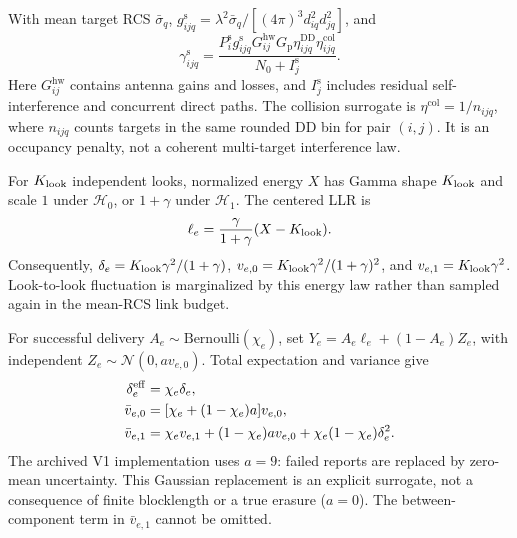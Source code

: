 With mean target RCS $\bar\sigma_q$,
$g_{ijq}^{\mathrm s}=\lambda^2\bar\sigma_q/[(4\pi)^3d_{iq}^2d_{jq}^2]$,
and
\begin{equation}
 \gamma_{ijq}^{\mathrm s}=
 \frac{P_i^{\mathrm s}g_{ijq}^{\mathrm s}G_{ij}^{\mathrm{hw}}G_{\mathrm p}
 \eta_{ijq}^{\mathrm{DD}}\eta_{ijq}^{\mathrm{col}}}
 {N_0+I_j^{\mathrm s}}.
 \label{eq:sensing_sinr}
\end{equation}
Here $G_{ij}^{\mathrm{hw}}$ contains antenna gains and losses, and $I_j^{\mathrm s}$
includes residual self-interference and concurrent direct paths.
The collision surrogate is $\eta^{\mathrm{col}}=1/n_{ijq}$, where $n_{ijq}$
counts targets in the same rounded DD bin for pair $(i,j)$.
It is an occupancy penalty, not a coherent multi-target interference law.

For $K_{\rm look}$ independent looks, normalized energy $X$ has Gamma shape
$K_{\rm look}$ and scale $1$ under $\mathcal H_0$, or $1+\gamma$ under
$\mathcal H_1$. The centered LLR is
\begin{equation}
 \ell_e=\frac{\gamma}{1+\gamma}(X-K_{\rm look}).
 \label{eq:local_llr}
\end{equation}
Consequently, $\delta_e=K_{\rm look}\gamma^2/(1+\gamma)$,
$v_{e,0}=K_{\rm look}\gamma^2/(1+\gamma)^2$, and
$v_{e,1}=K_{\rm look}\gamma^2$. Look-to-look fluctuation is marginalized by
this energy law rather than sampled again in the mean-RCS link budget.

For successful delivery $A_e\sim\mathrm{Bernoulli}(\chi_e)$, set
$Y_e=A_e\ell_e+(1-A_e)Z_e$, with independent
$Z_e\sim\mathcal N(0,a v_{e,0})$. Total expectation and variance give
\begin{equation}
\begin{aligned}
 \delta_e^{\rm eff}&=\chi_e\delta_e,\\
 \bar v_{e,0}&=[\chi_e+(1-\chi_e)a]v_{e,0},\\
 \bar v_{e,1}&=\chi_ev_{e,1}+(1-\chi_e)av_{e,0}
 +\chi_e(1-\chi_e)\delta_e^2.
\end{aligned}
 \label{eq:received_moments}
\end{equation}
The archived V1 implementation uses $a=9$: failed reports are replaced by
zero-mean uncertainty. This Gaussian replacement is an explicit surrogate,
not a consequence of finite blocklength or a true erasure ($a=0$).
The between-component term in $\bar v_{e,1}$ cannot be omitted.

